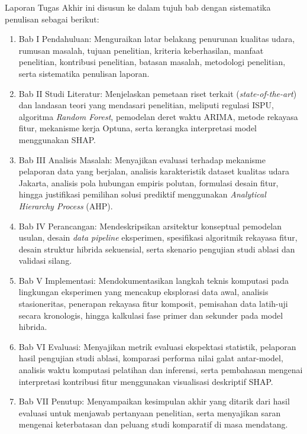 Laporan Tugas Akhir ini disusun ke dalam tujuh bab dengan sistematika penulisan sebagai berikut:

\begin{enumerate}
   \item {Bab I Pendahuluan:} Menguraikan latar belakang penurunan kualitas udara, rumusan masalah, tujuan penelitian, kriteria keberhasilan, manfaat penelitian, kontribusi penelitian, batasan masalah, metodologi penelitian, serta sistematika penulisan laporan.
   
   \newpage

   \item {Bab II Studi Literatur:} Menjelaskan pemetaan riset terkait (\textit{state-of-the-art}) dan landasan teori yang mendasari penelitian, meliputi regulasi ISPU, algoritma \textit{Random Forest}, pemodelan deret waktu ARIMA, metode rekayasa fitur, mekanisme kerja Optuna, serta kerangka interpretasi model menggunakan SHAP.
   \item {Bab III Analisis Masalah:} Menyajikan evaluasi terhadap mekanisme pelaporan data yang berjalan, analisis karakteristik dataset kualitas udara Jakarta, analisis pola hubungan empiris polutan, formulasi desain fitur, hingga justifikasi pemilihan solusi prediktif menggunakan \textit{Analytical Hierarchy Process} (AHP).
   \item {Bab IV Perancangan:} Mendeskripsikan arsitektur konseptual pemodelan usulan, desain \textit{data pipeline} eksperimen, spesifikasi algoritmik rekayasa fitur, desain struktur hibrida sekuensial, serta skenario pengujian studi ablasi dan validasi silang.
   \item {Bab V Implementasi:} Mendokumentasikan langkah teknis komputasi pada lingkungan eksperimen yang mencakup eksplorasi data awal, analisis stasioneritas, penerapan rekayasa fitur komposit, pemisahan data latih-uji secara kronologis, hingga kalkulasi fase primer dan sekunder pada model hibrida.
   \item {Bab VI Evaluasi:} Menyajikan metrik evaluasi ekspektasi statistik, pelaporan hasil pengujian studi ablasi, komparasi performa nilai galat antar-model, analisis waktu komputasi pelatihan dan inferensi, serta pembahasan mengenai interpretasi kontribusi fitur menggunakan visualisasi deskriptif SHAP.
   \item {Bab VII Penutup:} Menyampaikan kesimpulan akhir yang ditarik dari hasil evaluasi untuk menjawab pertanyaan penelitian, serta menyajikan saran mengenai keterbatasan dan peluang studi komparatif di masa mendatang.
\end{enumerate}